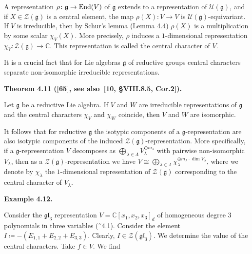 \documentclass[10pt,a4paper]{article}
\begin{document}
A representation $\rho\colon\mathfrak{g}\to\textnormal{End}(V)$ of $\mathfrak{g}$ extends to a representation of $\mathcal{U}(\mathfrak{g})$, and if $X\in\mathcal{Z}(\mathfrak{g})$ is a central element, the map $\rho(X):V\to V$ is $\mathcal{U}(\mathfrak{g})$-equivariant. If $V$ is irreducible, then by Schur’s lemma (Lemma 4.4) $\rho(X)$ is a multiplication by some scalar $\chi_{V}(X)$. More precisely, $\rho$ induces a $1$-dimensional representation $\chi_{V}:\mathcal{Z}(\mathfrak{g})\to\mathbb{C}$. This representation is called the central character of $V$.





It is a crucial fact that for Lie algebras $\mathfrak{g}$ of reductive groups central characters separate non-isomorphic irreducible representations.





\par\medskip\noindent\textbf{Theorem 4.11 ([65], see also [10, §VIII.8.5, Cor.2]).}\par



Let $\mathfrak{g}$ be a reductive Lie algebra.
If $V$ and $W$ are irreducible representations of $\mathfrak{g}$ and the central characters $\chi_{V}$ and $\chi_{W}$ coincide, then $V$ and $W$ are isomorphic.






It follows that for reductive $\mathfrak{g}$ the isotypic components of a $\mathfrak{g}$-representation are also isotypic components of the induced $\mathcal{Z}(\mathfrak{g})$-representation.
More specifically, if a $\mathfrak{g}$-representation $V$ decomposes as $\bigoplus_{\lambda\in\Lambda}V_{\lambda}^{\oplus m_{\lambda}}$ with pairwise non-isomorphic $V_{\lambda}$, then as a $\mathcal{Z}(\mathfrak{g})$-representation we have $V\cong\bigoplus_{\lambda\in\Lambda}\chi_{\lambda}^{\oplus m_{\lambda}\cdot\dim V_{\lambda}}$, where we denote by $\chi_{\lambda}$ the $1$-dimensional representation of $\mathcal{Z}(\mathfrak{g})$ corresponding to the central character of $V_{\lambda}$.





\par\medskip\noindent\textbf{Example 4.12.}\par



Consider the $\mathfrak{gl}_{3}$ representation $V=\mathbb{C}[x_{1},x_{2},x_{3}]_{d}$ of homogeneous degree 3 polynomials in three variables (˜4.1). Consider the element $I\coloneqq-(E_{1,1}+E_{2,2}+E_{3,3})$.
Clearly, $I\in\mathcal{Z}(\mathfrak{gl}_{3})$. We determine the value of the central characters. Take $f\in V$.
We find
\end{document}
